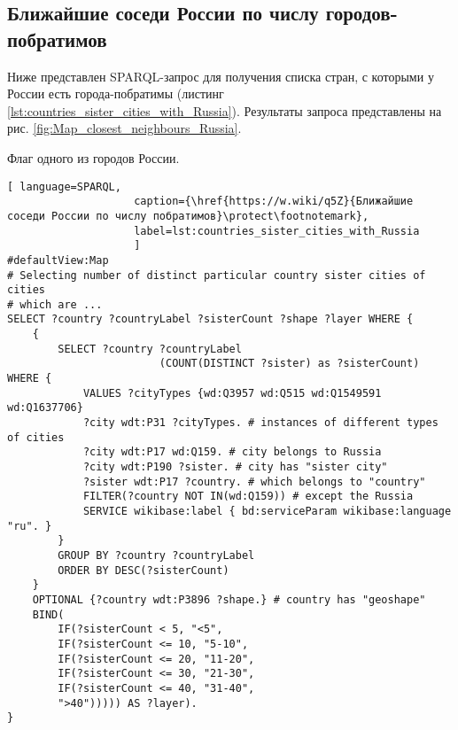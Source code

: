 \subsection{Ближайшие соседи России по числу городов-побратимов}

Ниже представлен SPARQL-запрос для получения списка стран, с которыми у России есть города-побратимы (листинг \ref{lst:countries_sister_cities_with_Russia}). Результаты запроса представлены на рис. \ref{fig:Map_closest_neighbours_Russia}.


\begin{marginfigure}[0.0cm]
{
\setlength{\fboxsep}{0pt}%
\setlength{\fboxrule}{1pt}%
%
}
  \caption{Флаг одного из городов России.}%
  \label{fig:flag_question_city}%
\end{marginfigure}


\begin{lstlisting}[ language=SPARQL, 
                    caption={\href{https://w.wiki/q5Z}{Ближайшие соседи России по числу побратимов}\protect\footnotemark},
                    label=lst:countries_sister_cities_with_Russia
                    ]
#defaultView:Map
# Selecting number of distinct particular country sister cities of cities 
# which are ...
SELECT ?country ?countryLabel ?sisterCount ?shape ?layer WHERE {
	{ 
		SELECT ?country ?countryLabel 
						(COUNT(DISTINCT ?sister) as ?sisterCount) WHERE {  
			VALUES ?cityTypes {wd:Q3957 wd:Q515 wd:Q1549591 wd:Q1637706}
			?city wdt:P31 ?cityTypes. # instances of different types of cities
			?city wdt:P17 wd:Q159. # city belongs to Russia
			?city wdt:P190 ?sister. # city has "sister city"
			?sister wdt:P17 ?country. # which belongs to "country"
			FILTER(?country NOT IN(wd:Q159)) # except the Russia
			SERVICE wikibase:label { bd:serviceParam wikibase:language "ru". }
		}
		GROUP BY ?country ?countryLabel
		ORDER BY DESC(?sisterCount)
	}
	OPTIONAL {?country wdt:P3896 ?shape.} # country has "geoshape"
	BIND(
		IF(?sisterCount < 5, "<5",
		IF(?sisterCount <= 10, "5-10",
		IF(?sisterCount <= 20, "11-20",
		IF(?sisterCount <= 30, "21-30",
		IF(?sisterCount <= 40, "31-40",
		">40"))))) AS ?layer).
}
\end{lstlisting}

